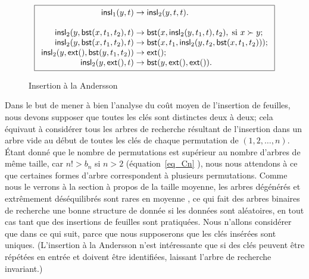 \begin{figure}
\begin{equation*}
\boxed{
\begin{array}{r@{\;}l@{\;}l}
\fun{insl}_1(y,t) & \rightarrow & \fun{insl}_2(y,t,t).\\
\\
\fun{insl}_2(y,\fun{bst}(x,t_1,t_2),t) & \rightarrow &
  \fun{bst}(x,\fun{insl}_2(y,t_1,t),t_2), \; \text{si \(x \succ y\)};\\
\fun{insl}_2(y,\fun{bst}(x,t_1,t_2),t) & \rightarrow &
  \fun{bst}(x,t_1,\fun{insl}_2(y,t_2,\fun{bst}(x,t_1,t_2)));\\
\fun{insl}_2(y,\fun{ext}(),\fun{bst}(y,t_1,t_2)) & \rightarrow & \fun{ext}();\\
\fun{insl}_2(y,\fun{ext}(),t) & \rightarrow & \fun{bst}(y,\fun{ext}(),\fun{ext}()).
\end{array}}
\end{equation*}
\caption{Insertion à la Andersson\label{fig_insl1}}
\end{figure}


Dans le but de mener à bien l'analyse du coût moyen de l'insertion de
feuilles, nous devons supposer que toutes les clés sont distinctes
deux à deux; cela équivaut à considérer tous les arbres de recherche
résultant de l'insertion dans un arbre vide au début de toutes les
clés de chaque permutation de \((1,2,\dots,n)\). Étant donné que le
nombre de permutations est supérieur au nombre d'arbres de même
taille, car \(n! > b_n\) si \(n > 2\) (équation~\eqref{eq_Cn}
), nous nous attendons à ce que certaines formes
d'arbre correspondent à plusieurs permutations. Comme nous le verrons
à la section à propos de la taille moyenne, les arbres dégénérés et
extrêmement déséquilibrés sont rares en moyenne \citep{Fill_1996}, ce
qui fait des arbres binaires de recherche une bonne structure de
donnée si les données sont aléatoires, en tout cas tant que des
insertions de feuilles sont pratiquées. Nous n'allons considérer que
 dans ce qui suit, parce que nous supposerons que les clés
insérées sont uniques. (L'insertion à la Andersson n'est intéressante
que si des clés peuvent être répétées en entrée et doivent être
identifiées, laissant l'arbre de recherche invariant.)

